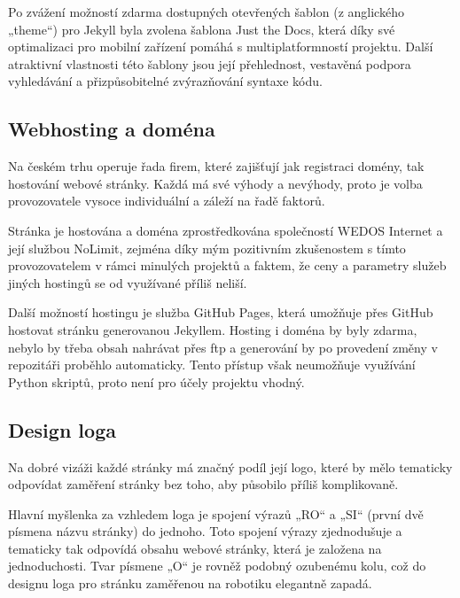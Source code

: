 \documentclass[a4paper, 12pt, twoside]{article}
\begin{document}
  Po zvážení možností zdarma dostupných otevřených šablon (z anglického „theme“) pro Jekyll byla zvolena šablona Just the Docs, která díky své optimalizaci pro mobilní zařízení pomáhá s multiplatformností projektu. Další atraktivní vlastnosti této šablony jsou její přehlednost, vestavěná podpora vyhledávání a přizpůsobitelné zvýrazňování syntaxe kódu.


  \subsection{Webhosting a doména} \label{sec:Webhosting a doména}
  Na českém trhu operuje řada firem, které zajišťují jak registraci domény, tak hostování webové stránky. Každá má své výhody a nevýhody, proto je volba provozovatele vysoce individuální a záleží na řadě faktorů.

  Stránka je hostována a doména zprostředkována společností WEDOS Internet a její službou NoLimit, zejména díky mým pozitivním zkušenostem s tímto provozovatelem v rámci minulých projektů a faktem, že ceny a parametry služeb jiných hostingů se od využívané příliš neliší.

  Další možností hostingu je služba GitHub Pages, která umožňuje přes GitHub hostovat stránku generovanou Jekyllem. Hosting i doména by byly zdarma, nebylo by třeba obsah nahrávat přes \acrshort{ftp} a generování by po provedení změny v repozitáři proběhlo automaticky. Tento přístup však neumožňuje využívání Python skriptů, proto není pro účely projektu vhodný.


  \subsection{Design loga}
  Na dobré vizáži každé stránky má značný podíl její logo, které by mělo tematicky odpovídat zaměření stránky bez toho, aby působilo příliš komplikovaně.

  Hlavní myšlenka za vzhledem loga je spojení výrazů „RO“ a „SI“ (první dvě písmena názvu stránky) do jednoho. Toto spojení výrazy zjednodušuje a tematicky tak odpovídá obsahu webové stránky, která je založena na jednoduchosti. Tvar písmene „O“ je rovněž podobný ozubenému kolu, což do designu loga pro stránku zaměřenou na robotiku elegantně zapadá.
\end{document}
